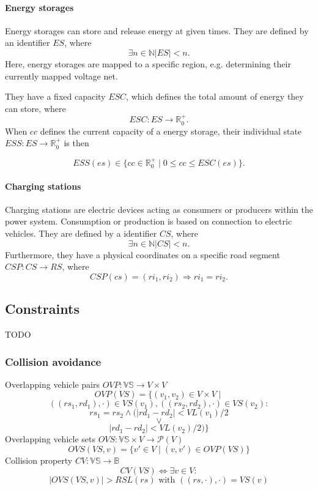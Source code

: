 \paragraph{Energy storages}
\label{energy_storages}

Energy storages can store and release energy at given times. They are defined by an identifier $ES$, where 
\[
\exists n \in \mathbb{N} |ES| < n \mathrm{.}
\]
Here, energy storages are mapped to a specific region, e.g. determining their currently mapped voltage net.

They have a fixed capacity $ESC$, which defines the total amount of energy they can store, where
\[	
ESC : ES \rightarrow \mathbb{R}_0^+ \mathrm{.}
\]
When $cc$ defines the current capacity of a energy storage, their individual state $ESS : ES \rightarrow \mathbb{R}_0^+$ is then

\[
ESS(es) \in \{cc \in \mathbb{R}_0^+ \mid 0 \leq cc \leq ESC(es)\} \mathrm{.}
\]

\paragraph{Charging stations}
\label{charging_stations}

Charging stations are electric devices acting as consumers or producers within the power system. Consumption or production is based on connection to electric vehicles. They are defined by a identifier $CS$, where
\[
\exists n \in \mathbb{N} |CS| < n \mathrm{.}
\]
Furthermore, they have a physical coordinates on a specific road segment $CSP : CS \rightarrow RS$, where
\[
CSP(cs) = (ri_1, ri_2) \Rightarrow ri_1 = ri_2 \mathrm{.}
\]

\subsection{Constraints}
\label{constraints}

TODO

\subsubsection{Collision avoidance}
\label{collisions}

Overlapping vehicle pairs $OVP : \mathbb{VS} \rightarrow V \times V$
\[
OVP(VS) = \{(v_1, v_2) \in V \times V \mid
\]
\[
((rs_1,rd_1),\cdot) \in VS(v_1), ((rs_2,rd_2),\cdot) \in VS(v_2) :
\]
\[
rs_1 = rs_2 \wedge (|rd_1 - rd_2| < VL(v_1) / 2
\]
\[
\vee
\]
\[
|rd_1 - rd_2| < VL(v_2) / 2)\}
\]
Overlapping vehicle sets $OVS : \mathbb{VS} \times V \rightarrow \mathcal{P}(V)$
\[
OVS(VS,v) = \{v' \in V \mid (v, v') \in OVP(VS)\}
\]
Collision property $CV : \mathbb{VS} \rightarrow \mathbb{B}$
\[
CV(VS) \Leftrightarrow \exists v \in V :
\]
\[
|OVS(VS, v)| > RSL(rs) \text{ with } ((rs,\cdot),\cdot) = VS(v)
\]

